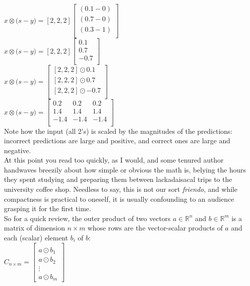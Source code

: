 \documentclass{article}
\begin{document}
$x \otimes \big(s - y\big) = [2,2,2]
\begin{bmatrix} (0.1 - 0) \\
         (0.7 - 0) \\
         (0.3 - 1) \\
         \end{bmatrix}
$ \\

$x \otimes \big(s - y\big) = [2,2,2]
\begin{bmatrix} 0.1 \\
         0.7 \\
         -0.7 \\
         \end{bmatrix}
$ \\

$x \otimes \big(s - y\big) =
\begin{bmatrix} [2,2,2] \odot 0.1 \\
         [2,2,2] \odot 0.7\\
         [2,2,2] \odot -0.7\\
         \end{bmatrix}
$ \\

$x \otimes \big(s - y\big) =
\begin{bmatrix} 0.2 & 0.2 & 0.2 \\
         1.4 & 1.4 & 1.4 \\
         -1.4 & -1.4 & -1.4 \\
         \end{bmatrix}
$ \\

Note how the input (all 2's) is scaled by the magnitudes of the predictions: incorrect predictions are large and positive, and correct ones are large and negative. \\

At this point you read too quickly, as I would, and some tenured author handwaves breezily about how simple or obvious the math is, belying the hours they spent studying and preparing them between lackadaisacal trips to the university coffee shop. Needless to say, this is not our sort \textit{friendo}, and while compactness is practical to oneself, it is usually confounding to an audience grasping it for the first time. \\

So for a quick review, the outer product of two vectors $a \in \mathbb{R}^{n}$ and $b \in \mathbb{R}^{m}$ is a matrix of dimension $n \times m$ whose rows are the vector-scalar products of $a$ and each (scalar) element $b_{i}$ of $b$: \\
$C_{n \times m} = \begin{bmatrix} \\
         a \odot b_{1} \\
         a \odot b_{2} \\
          \vdots \\
         a \odot b_{m}
         \end{bmatrix}
$ \\
\end{document}
